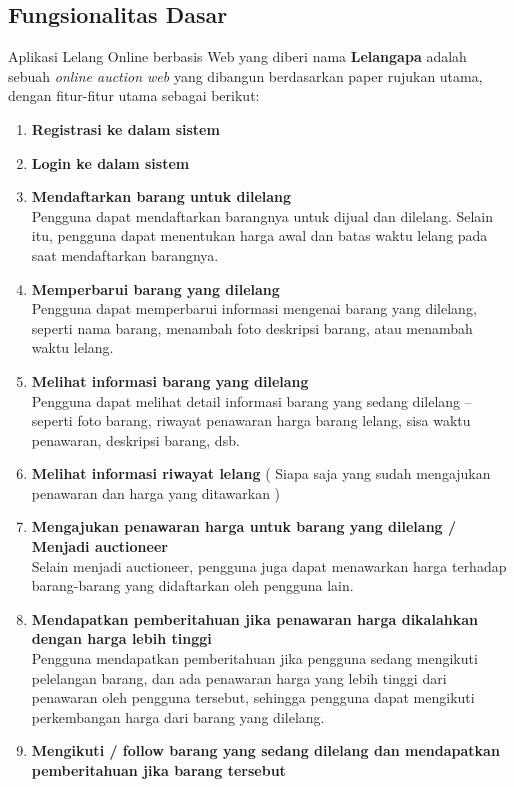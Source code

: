 \subsection{Fungsionalitas Dasar}

Aplikasi Lelang Online berbasis Web yang diberi nama \textbf{Lelangapa} adalah sebuah \textit{online auction web} yang dibangun berdasarkan paper rujukan utama, dengan fitur-fitur utama sebagai berikut:

\begin{enumerate}
	\item \textbf{Registrasi ke dalam sistem}
	\item \textbf{Login ke dalam sistem}
	\item \textbf{Mendaftarkan barang untuk dilelang} \\
	Pengguna dapat mendaftarkan barangnya untuk dijual dan dilelang. Selain itu, pengguna dapat menentukan harga awal dan batas waktu lelang pada saat mendaftarkan barangnya.
	\item \textbf{Memperbarui barang yang dilelang} \\
	Pengguna dapat memperbarui informasi mengenai barang yang dilelang, seperti nama barang, menambah foto deskripsi barang, atau menambah waktu lelang.
	\item \textbf{Melihat informasi barang yang dilelang} \\
	Pengguna dapat melihat detail informasi barang yang sedang dilelang – seperti foto barang, riwayat penawaran harga barang lelang, sisa waktu penawaran, deskripsi barang, dsb.
	\item \textbf{Melihat informasi riwayat lelang} ( Siapa saja yang sudah mengajukan penawaran dan harga yang ditawarkan )
	\item \textbf{Mengajukan penawaran harga untuk barang yang dilelang / Menjadi auctioneer} \\
	Selain menjadi auctioneer, pengguna juga dapat menawarkan harga terhadap barang-barang yang didaftarkan oleh pengguna lain.
	\item \textbf{Mendapatkan pemberitahuan jika penawaran harga dikalahkan dengan harga lebih tinggi} \\
	Pengguna mendapatkan pemberitahuan jika pengguna sedang mengikuti pelelangan barang, dan ada penawaran harga yang lebih tinggi dari penawaran oleh pengguna tersebut, sehingga pengguna dapat mengikuti perkembangan harga dari barang yang dilelang.
	\item \textbf{Mengikuti / follow barang yang sedang dilelang dan mendapatkan pemberitahuan jika barang tersebut }\\

\end{enumerate}
